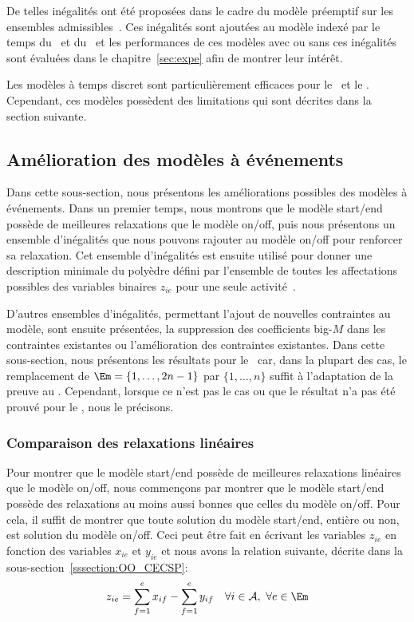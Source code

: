De telles inégalités ont été proposées dans le cadre du modèle
préemptif sur les ensembles admissibles~\cite{BD}. Ces inégalités sont
ajoutées au modèle indexé par le temps du \CECSP~et du \RCPSP~et les
performances de ces modèles avec ou sans ces inégalités sont évaluées
dans le chapitre~\ref{sec:expe} afin de montrer leur intérêt.

 
Les modèles à temps discret sont particulièrement efficaces pour le
\RCPSP~et le \CECSP. Cependant, ces modèles possèdent des limitations
qui sont décrites dans la section suivante. 



\subsection{Amélioration des modèles à événements}
\label{sec:amelioration_OO}
Dans cette sous-section, nous présentons les améliorations possibles des
modèles à événements. Dans un premier temps, nous montrons que le
modèle start/end possède de meilleures relaxations que le modèle
on/off, puis nous présentons un ensemble d'inégalités que nous pouvons
rajouter au modèle on/off pour renforcer sa relaxation. Cet ensemble
d'inégalités est ensuite utilisé pour donner une description minimale
du polyèdre défini par l'ensemble de toutes les affectations possibles
des variables binaires $z_{ie}$ pour une seule
activité~\cite{LAASreport}.  

D'autres ensembles d'inégalités, permettant l'ajout de nouvelles
contraintes au modèle, sont ensuite présentées, la suppression des
coefficients big-$M$ dans les contraintes existantes ou l'amélioration
des contraintes existantes. Dans cette sous-section, nous présentons les
résultats pour le \CECSP~car, dans la plupart des cas, le remplacement
de $\Em=\{1,\dots,2n-1\}$ par $\{1,\dots,n\}$ suffit à l'adaptation de
la preuve au \RCPSP. Cependant, lorsque ce n'est pas le cas ou que le
résultat n'a pas été prouvé pour le \RCPSP, nous le précisons.

\subsubsection{Comparaison des relaxations linéaires}

Pour montrer que le modèle start/end possède de meilleures relaxations
linéaires que le modèle on/off, nous commençons par montrer que le
modèle start/end possède des relaxations au moins aussi bonnes que
celles du modèle on/off. Pour cela, il suffit de  montrer que toute solution du 
modèle start/end, entière ou non, est solution du modèle on/off. Ceci
peut être fait en écrivant les variables $z_{ie}$ en fonction des
variables $x_{ie}$ et $y_{ie}$ et nous avons la relation suivante,
décrite dans la sous-section~\ref{sssection:OO_CECSP}: 
\begin{equation}
\label{SEversOO}
z_{ie} = \sum_{f=1}^e x_{if} -  \sum_{f=1}^e y_{if} \quad \forall i
\in \A,\ \forall e\in \Em
\end{equation}

